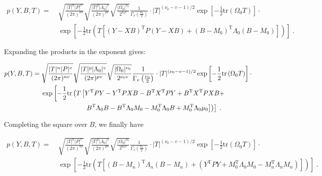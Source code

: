 \documentclass[a4paper,12pt,twoside]{book}
\begin{document}
\begin{equation} \label{eq:mblr-post-GLM-NW-JL-s2}
\begin{split}
p(Y,B,T) = \; & \sqrt{\frac{|T|^n |P|^v}{(2 \pi)^{nv}}} \sqrt{\frac{|T|^p |\Lambda_0|^v}{(2 \pi)^{pv}}} \sqrt{\frac{|\Omega_0|^{\nu_0}}{2^{\nu_0 v}}} \frac{1}{\Gamma_v \left( \frac{\nu_0}{2} \right)} \cdot |T|^{(\nu_0-v-1)/2} \exp\left[ -\frac{1}{2} \mathrm{tr}\left( \Omega_0 T \right) \right] \cdot \\
& \exp\left[ -\frac{1}{2} \mathrm{tr}\left( T \left[ (Y-XB)^\mathrm{T} P (Y-XB) + (B-M_0)^\mathrm{T} \Lambda_0 (B-M_0) \right] \right) \right] \; .
\end{split}
\end{equation}

Expanding the products in the exponent gives:

\begin{equation} \label{eq:mblr-post-GLM-NW-JL-s3}
\begin{split}
p(Y,B,T) = \; & \sqrt{\frac{|T|^n |P|^v}{(2 \pi)^{nv}}} \sqrt{\frac{|T|^p |\Lambda_0|^v}{(2 \pi)^{pv}}} \sqrt{\frac{|\Omega_0|^{\nu_0}}{2^{\nu_0 v}}} \frac{1}{\Gamma_v \left( \frac{\nu_0}{2} \right)} \cdot |T|^{(\nu_0-v-1)/2} \exp\left[ -\frac{1}{2} \mathrm{tr}\left( \Omega_0 T \right) \right] \cdot \\
& \exp\left[ -\frac{1}{2} \mathrm{tr}\left( T \left[ Y^\mathrm{T} P Y - Y^\mathrm{T} P X B - B^\mathrm{T} X^\mathrm{T} P Y + B^\mathrm{T} X^\mathrm{T} P X B + \right. \right. \right. \\
& \hphantom{\exp\left[ -\frac{1}{2} \mathrm{tr}\left( T \left[ \right. \right. \right. \!\!\!} \; \left. \left. \left. B^\mathrm{T} \Lambda_0 B - B^\mathrm{T} \Lambda_0 M_0 - M_0^\mathrm{T} \Lambda_0 B + M_0^\mathrm{T} \Lambda_0 \mu_0 \right] \right) \right] \; .
\end{split}
\end{equation}

Completing the square over $B$, we finally have

\begin{equation} \label{eq:mblr-post-GLM-NW-JL-s4}
\begin{split}
p(Y,B,T) = \; & \sqrt{\frac{|T|^n |P|^v}{(2 \pi)^{nv}}} \sqrt{\frac{|T|^p |\Lambda_0|^v}{(2 \pi)^{pv}}} \sqrt{\frac{|\Omega_0|^{\nu_0}}{2^{\nu_0 v}}} \frac{1}{\Gamma_v \left( \frac{\nu_0}{2} \right)} \cdot |T|^{(\nu_0-v-1)/2} \exp\left[ -\frac{1}{2} \mathrm{tr}\left( \Omega_0 T \right) \right] \cdot \\
& \exp\left[ -\frac{1}{2} \mathrm{tr}\left( T \left[ (B-M_n)^\mathrm{T} \Lambda_n (B-M_n) + (Y^\mathrm{T} P Y + M_0^\mathrm{T} \Lambda_0 M_0 - M_n^\mathrm{T} \Lambda_n M_n) \right] \right) \right] \; .
\end{split}
\end{equation}
\end{document}
